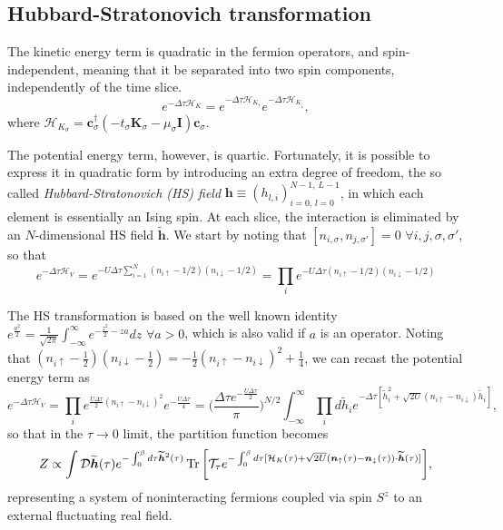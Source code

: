 \subsection{Hubbard-Stratonovich transformation}\label{subsec:HStransf}

The kinetic energy term is quadratic in the fermion operators, and spin-independent, meaning that it be separated into two spin components, independently of the time slice.
\begin{equation}
e^{-\Delta\tau \mathcal{H}_K} = e^{-\Delta\tau \mathcal{H}_{K_\uparrow}} e^{-\Delta\tau \mathcal{H}_{K_\downarrow}} ,
\end{equation}
where $\mathcal{H}_{K_\sigma} = \bm c_\sigma^\dagger (-t_\sigma \bm K_\sigma - \mu_\sigma \bm I )  \bm c_\sigma$.

The potential energy term, however, is quartic.
Fortunately, it is possible to express it in quadratic form by introducing an extra degree of freedom, the so called \emph{Hubbard-Stratonovich (HS) field} $\bm h \equiv (h_{l, i})_{i=0,\, l= 0}^{N-1, \, L - 1}$, in which each element is essentially an Ising spin.
At each slice, the interaction is eliminated by an $N$-dimensional HS field $\widetilde{\bm h}$.
We start by noting that $[ n_{i,\sigma} , n_{j,\sigma'} ] = 0 \,\, \forall i, j, \sigma, \sigma'$, so that
\begin{equation}\label{eq:Hint}
e^{-\Delta\tau \mathcal{H}_V} = e^{-U \Delta\tau \sum_{i=1}^N (n_{i\uparrow} - 1/2 ) (n_{i\downarrow} - 1/2 )} = \prod_i e^{-U \Delta\tau (n_{i\uparrow} - 1/2 ) (n_{i\downarrow} - 1/2 )}
\end{equation}

The HS transformation is based on the well known identity 
$
e^{ \frac{a^2}{2}} = \frac{1}{\sqrt{2\pi}} \int_{-\infty}^{\infty} e^{-\frac{z^2}{2}  - za } dz
$ 
$ \forall a > 0$, 
which is also valid if $a$ is an operator.
Noting that $(n_{i\uparrow} - \frac{1}{2} ) (n_{i\downarrow} - \frac{1}{2} ) = -\frac{1}{2} ( n_{i\uparrow} - n_{i\downarrow} )^2 + \frac{1}{4}$, we can recast the potential energy term as
\begin{equation}\label{eq:gaussianForm}
e^{-\Delta\tau \mathcal{H}_V} = \prod_i e^{ \frac{U \Delta \tau}{2} ( n_{i\uparrow} - n_{i\downarrow} )^2 } e^{- \frac{U \Delta \tau}{4}}
=\bigg( \frac{\Delta \tau e^{- \frac{U \Delta \tau}{2}}}{\pi} \bigg)^{N/2} \int_{-\infty}^\infty \prod_i d \widetilde{h}_i e^{-\Delta \tau [ \widetilde{h}_i^2 + \sqrt{2U} ( n_{i\uparrow} - n_{i\downarrow} ) \widetilde{h}_i ]} ,
\end{equation}
so that in the $\tau \rightarrow 0$ limit, the partition function becomes
\begin{equation}
Z \propto \int \mathcal{D} \widetilde{\bm h} ( \tau) e^{-\int_0^\beta d\tau \widetilde{\bm h}^2 ( \tau ) } \operatorname{Tr} \bigg[ \mathcal{T}_\tau e^{ -\int_0^\beta d\tau [ \mathcal{H}_K ( \tau ) + \sqrt{2U} ( \bm n_{\uparrow} (\tau) - \bm n_{\downarrow} (\tau ) ) \cdot \widetilde{\bm h}(\tau) ] } \bigg] ,
\end{equation}
representing a system of noninteracting fermions coupled via spin $S^z$ to an external fluctuating real field.

